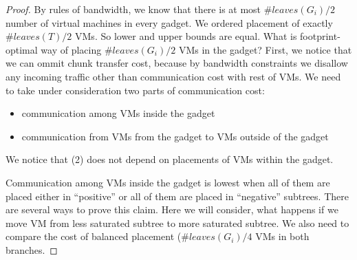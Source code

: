 \begin{proof}
By rules of bandwidth, we know that there is at most $\# leaves(G_i) / 2$ number of virtual
machines in every gadget. We ordered placement of exactly
$\# leaves(T) / 2$ VMs. So lower and upper bounds are equal. What is
footprint-optimal way of placing $\# leaves(G_i) / 2$ VMs in the gadget?
First, we notice that we can ommit chunk transfer cost, because by
bandwidth constraints we disallow any incoming traffic other than
communication cost with rest of VMs. We need to take under
consideration two parts of communication cost:
\begin{itemize}
\item communication among VMs inside the gadget
\item communication from VMs from the gadget to VMs outside of the gadget
\end{itemize}

We notice that (2) does not depend on placements of VMs within the
gadget.

Communication among VMs inside the gadget is lowest when all of them
are placed either in ``positive'' or all of them are placed in
``negative'' subtrees. There are several ways to prove this claim.
Here we will consider, what happens if we move VM from less saturated
subtree to more saturated subtree. We also need to compare the cost of
balanced placement ($\# leaves(G_i)/4$ VMs in both branches. 
\end{proof}
